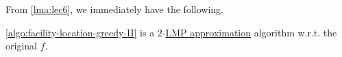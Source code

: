 From \autoref{lma:lec6}, we immediately have the following.

\begin{theorem}
	\autoref{algo:facility-location-greedy-II} is a \(2\)-\hyperref[def:LMP]{LMP approximation} algorithm w.r.t. the original \(f\).
\end{theorem}